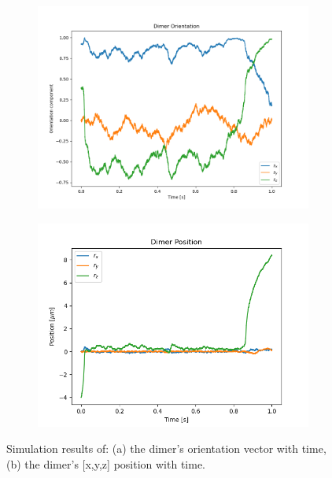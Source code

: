 \documentclass[preprint,  3p]{elsarticle}
\begin{document}
\begin{figure}[h]
	\centering
	\begin{subfigure}{0.45\textwidth}
		\subcaption{}
		\includegraphics[width =\textwidth]{./Images/fig7a.png}
	\end{subfigure}
	\begin{subfigure}{0.45\textwidth}
		\subcaption{}
		\includegraphics[width=\textwidth]{./Images/fig7b.png}
	\end{subfigure}
	\caption{Simulation results of: (a) the dimer's orientation vector with time, (b) the dimer's [x,y,z] position with time.}
	\label{fig:motion}
\end{figure}
\end{document}
